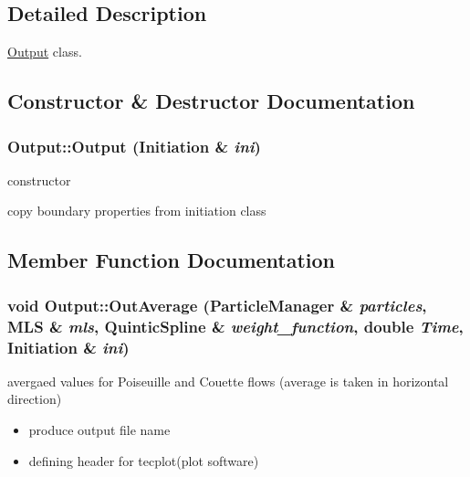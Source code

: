 \subsection{Detailed Description}
\hyperlink{classOutput}{Output} class. 

\subsection{Constructor \& Destructor Documentation}
\hypertarget{classOutput_2bd84635e13bedd1b8417fd39062a767}{
\subsubsection[{Output}]{\setlength{\rightskip}{0pt plus 5cm}Output::Output ({\bf Initiation} \& {\em ini})}}
\label{classOutput_2bd84635e13bedd1b8417fd39062a767}


constructor 



copy boundary properties from initiation class 

\subsection{Member Function Documentation}
\hypertarget{classOutput_13b9be49d851806b4ab40d60624095ad}{
\subsubsection[{OutAverage}]{\setlength{\rightskip}{0pt plus 5cm}void Output::OutAverage ({\bf ParticleManager} \& {\em particles}, \/  {\bf MLS} \& {\em mls}, \/  {\bf QuinticSpline} \& {\em weight\_\-function}, \/  double {\em Time}, \/  {\bf Initiation} \& {\em ini})}}
\label{classOutput_13b9be49d851806b4ab40d60624095ad}


avergaed values for Poiseuille and Couette flows (average is taken in horizontal direction) 



\begin{itemize}
\item produce output file name\end{itemize}


\begin{itemize}
\item defining header for tecplot(plot software)\end{itemize}


